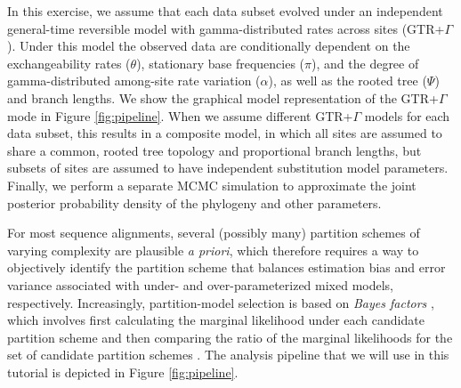 In this exercise, we assume that each data subset evolved under an independent general-time reversible model with gamma-distributed rates across sites (GTR+$\Gamma$). 
Under this model the observed data are conditionally dependent on the exchangeability rates ($\theta$), stationary base frequencies ($\pi$), and the degree of gamma-distributed among-site rate variation ($\alpha$), as well as the rooted tree ($\Psi$) and branch lengths.
We show the graphical model representation of the GTR+$\Gamma$ mode in Figure \ref{fig:pipeline}. 
When we assume different GTR+$\Gamma$ models for each data subset, this results in a composite model, in which all sites are assumed to share a common, rooted tree topology and proportional branch lengths, but subsets of sites are assumed to have independent substitution model parameters.
Finally, we perform a separate MCMC simulation to approximate the joint posterior probability density of the phylogeny and other parameters. 

For most sequence alignments, several (possibly many) partition schemes of varying complexity are plausible \emph{a priori}, which therefore requires a way to objectively identify the partition scheme that balances estimation bias and error variance associated with under- and over-parameterized mixed models, respectively.
Increasingly, partition-model selection is based on \textit{Bayes factors} \citep[\EG][]{Suchard2001}, which involves first calculating the marginal likelihood under each candidate partition scheme and then comparing the ratio of the marginal likelihoods for the set of candidate partition schemes \citep{Brandley2005,Nylander2004,Mcguire2007}.
The analysis pipeline that we will use in this tutorial is depicted in Figure \ref{fig:pipeline}.

